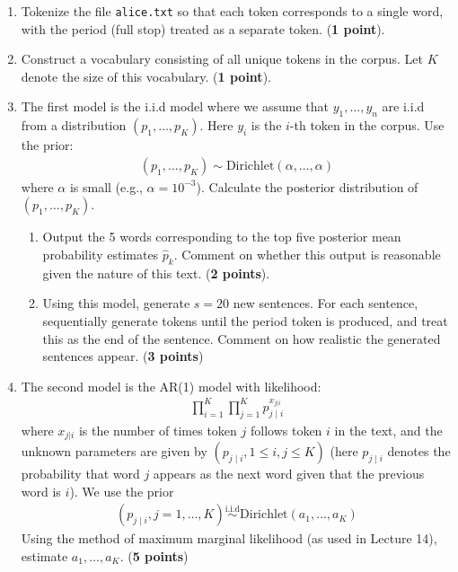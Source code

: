 \documentclass{scrartcl}
\begin{document}
\begin{enumerate}
 \begin{enumerate}
 \item Tokenize the file \texttt{alice.txt} so that each token
   corresponds to a single word, with the period (full stop) treated
   as a separate token. (\textbf{1 point}).
 \item Construct a vocabulary consisting of all unique tokens in the
   corpus. Let $K$ denote the size of this vocabulary. (\textbf{1
     point}).
 \item The first model is the i.i.d model where we assume that $y_1,
   \dots, y_n$  are i.i.d from a distribution $(p_1, \dots,
   p_K)$. Here $y_i$ is the $i$-th token in the corpus. Use the prior:
   \begin{align*}
     (p_1, \dots, p_K) \sim \text{Dirichlet}(\alpha, \dots, \alpha)
   \end{align*}
   where $\alpha$ is small (e.g., $\alpha = 10^{-3}$). Calculate the
   posterior distribution of $(p_1, \dots, p_K)$.
   \begin{enumerate}
   \item Output the 5 words corresponding to the top five posterior
     mean probability estimates $\hat{p}_k$. Comment on whether this
     output is reasonable given the nature of this text. (\textbf{2
       points}).
   \item Using this model, generate $s = 20$ new sentences. For each
     sentence, sequentially generate tokens until the period token is
     produced, and treat this as the end of the sentence. Comment on
     how realistic the generated sentences appear. (\textbf{3 points})     
   \end{enumerate}
 \item The second model is the AR(1) model with likelihood:
   \begin{align*}
     \prod_{i=1}^K \prod_{j=1}^K p_{j \mid i}^{x_{j|i}}
   \end{align*}
   where $x_{j|i}$ is the number of times token $j$ follows token $i$
   in the text, and the unknown parameters are given by $(p_{j \mid
     i}, 1 \leq i, j \leq K)$ (here $p_{j \mid i}$ denotes the
   probability that word $j$ appears as the next word given that the
   previous word is $i$). We use the prior
   \begin{align*}
     (p_{j \mid i}, j = 1, \dots, K) \overset{\text{i.i.d}}{\sim}
     \text{Dirichlet}(a_1, \dots, a_K)
   \end{align*}
   Using the method of maximum marginal likelihood (as used in Lecture
   14), estimate $a_1, \dots, a_K$. (\textbf{5 points})

\end{enumerate}
\end{enumerate}
\end{document}
